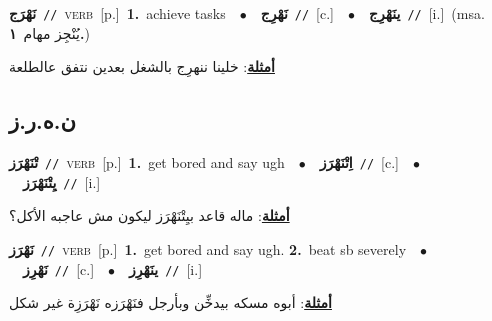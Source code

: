 \documentclass[10pt,a4paper,twoside]{article} %
\begin{document}
\begin{multicols}{2}
{\setlength\topsep{0pt}\textbf{\foreignlanguage{arabic}{نَهْرَج}}\ {\color{gray}\texttt{//}\color{black}}\ \textsc{verb}\ [p.]\ \textbf{1.}~achieve tasks\ \ $\bullet$\ \ \setlength\topsep{0pt}\textbf{\foreignlanguage{arabic}{نَهْرِج}}\ {\color{gray}\texttt{//}\color{black}}\ [c.]\ \ $\bullet$\ \ \setlength\topsep{0pt}\textbf{\foreignlanguage{arabic}{ينَهْرِج}}\ {\color{gray}\texttt{//}\color{black}}\ [i.]\ \color{gray}(msa. \foreignlanguage{arabic}{يُنْجِز مهام}~\foreignlanguage{arabic}{\textbf{١.}})\color{black}\  \begin{flushright}\color{gray}\foreignlanguage{arabic}{\textbf{\underline{\foreignlanguage{arabic}{أمثلة}}}: خلينا ننهرِج بالشغل بعدين نتفق عالطلعة}\end{flushright}\color{black}} \vspace{2mm}

\vspace{-3mm}
\subsection*{\color{blue}\foreignlanguage{arabic}{ن.ه.ر.ز}\color{blue}{}} 

{\setlength\topsep{0pt}\textbf{\foreignlanguage{arabic}{تْنَهْرَز}}\ {\color{gray}\texttt{//}\color{black}}\ \textsc{verb}\ [p.]\ \textbf{1.}~get bored and say ugh\ \ $\bullet$\ \ \setlength\topsep{0pt}\textbf{\foreignlanguage{arabic}{اِتْنَهْرَز}}\ {\color{gray}\texttt{//}\color{black}}\ [c.]\ \ $\bullet$\ \ \setlength\topsep{0pt}\textbf{\foreignlanguage{arabic}{يِتْنَهْرَز}}\ {\color{gray}\texttt{//}\color{black}}\ [i.]\  \begin{flushright}\color{gray}\foreignlanguage{arabic}{\textbf{\underline{\foreignlanguage{arabic}{أمثلة}}}: ماله قاعد بيِتْنَهْرَز ليكون مش عاجبه الأكل؟}\end{flushright}\color{black}} \vspace{2mm}

{\setlength\topsep{0pt}\textbf{\foreignlanguage{arabic}{نَهْرَز}}\ {\color{gray}\texttt{//}\color{black}}\ \textsc{verb}\ [p.]\ \textbf{1.}~get bored and say ugh.  \textbf{2.}~beat sb severely\ \ $\bullet$\ \ \setlength\topsep{0pt}\textbf{\foreignlanguage{arabic}{نَهْرِز}}\ {\color{gray}\texttt{//}\color{black}}\ [c.]\ \ $\bullet$\ \ \setlength\topsep{0pt}\textbf{\foreignlanguage{arabic}{ينَهْرِز}}\ {\color{gray}\texttt{//}\color{black}}\ [i.]\  \begin{flushright}\color{gray}\foreignlanguage{arabic}{\textbf{\underline{\foreignlanguage{arabic}{أمثلة}}}: أبوه مسكه بيدخِّن وبأرجل فنَهْرَزه نَهْرَزِة غير شكل}\end{flushright}\color{black}} \vspace{2mm}


\end{multicols}
\end{document}
